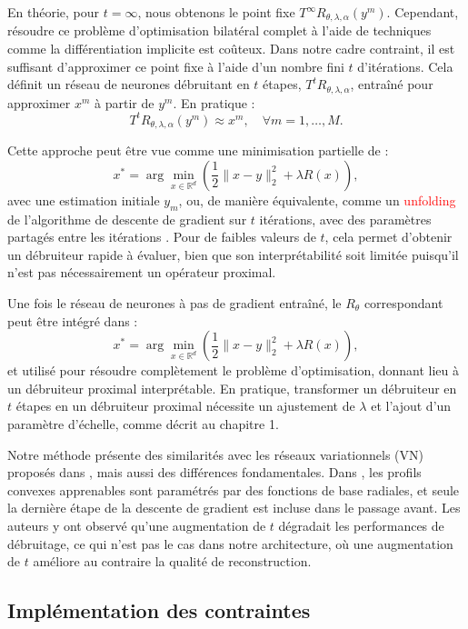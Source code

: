 \documentclass[a4paper, 12pt]{report} %
\begin{document}
En théorie, pour \( t = \infty \), nous obtenons le point fixe \( T^\infty R_{\theta, \lambda, \alpha}(y^m) \). Cependant, résoudre ce problème d’optimisation bilatéral complet à l’aide de techniques comme la différentiation implicite \cite{pramanik2023memory,chen2014insights} est coûteux. Dans notre cadre contraint, il est suffisant d’approximer ce point fixe à l’aide d’un nombre fini \( t \) d’itérations. Cela définit un réseau de neurones débruitant en \( t \) étapes, \( T^t R_{\theta, \lambda, \alpha} \), entraîné pour approximer \( x^m \) à partir de \( y^m \). En pratique :  
\[
T^t R_{\theta, \lambda, \alpha}(y^m) \approx x^m, \quad \forall m = 1, \ldots, M.
\]

Cette approche peut être vue comme une minimisation partielle de :  
\[
x^* = \arg \min_{x \in \mathbb{R}^d} \left( \frac{1}{2} \| x - y \|_2^2 + \lambda R(x) \right),
\]
avec une estimation initiale \( y_m \), ou, de manière équivalente, comme un \textcolor{red}{unfolding} de l’algorithme de descente de gradient sur \( t \) itérations, avec des paramètres partagés entre les itérations \cite{aggarwal2018modl,pramanik2020deep}. Pour de faibles valeurs de \( t \), cela permet d’obtenir un débruiteur rapide à évaluer, bien que son interprétabilité soit limitée puisqu’il n’est pas nécessairement un opérateur proximal.

Une fois le réseau de neurones à pas de gradient entraîné, le \( R_\theta \) correspondant peut être intégré dans :  
\[
x^* = \arg \min_{x \in \mathbb{R}^d} \left( \frac{1}{2} \| x - y \|_2^2 + \lambda R(x) \right),
\]
et utilisé pour résoudre complètement le problème d’optimisation, donnant lieu à un débruiteur proximal interprétable. En pratique, transformer un débruiteur en \( t \) étapes en un débruiteur proximal nécessite un ajustement de \( \lambda \) et l’ajout d’un paramètre d’échelle, comme décrit au chapitre 1.

Notre méthode présente des similarités avec les réseaux variationnels (VN) proposés dans \cite{kobler2017variational}, mais aussi des différences fondamentales. Dans \cite{kobler2017variational}, les profils convexes apprenables sont paramétrés par des fonctions de base radiales, et seule la dernière étape de la descente de gradient est incluse dans le passage avant. Les auteurs y ont observé qu’une augmentation de \( t \) dégradait les performances de débruitage, ce qui n’est pas le cas dans notre architecture, où une augmentation de \( t \) améliore au contraire la qualité de reconstruction.

\subsection{Implémentation des contraintes}
\end{document}

